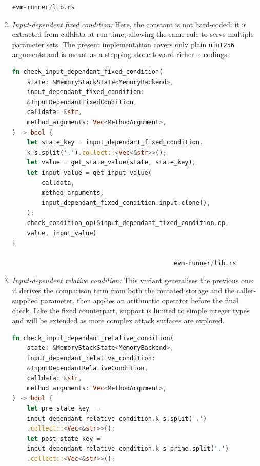 \begin{enumerate}
\begin{lstlisting}[caption={[check\_relative\_condition]},label={lst:relative},language=Rust]
                                            evm-runner/lib.rs
\end{lstlisting}

\item \textit{Input-dependent fixed condition:}  
      Here, the constant is not hard-coded: it is extracted from
      calldata at run-time, allowing the same rule to serve multiple parameter
      sets.  The present implementation covers only plain \texttt{uint256}
      arguments and is meant as a stepping-stone toward richer encodings.
\begin{lstlisting}[caption={[check\_input\_dependant\_fixed\_condition]},
                   label={lst:idfixed},language=Rust]
fn check_input_dependant_fixed_condition(
    state: &MemoryStackState<MemoryBackend>,
    input_dependant_fixed_condition: 
    &InputDependantFixedCondition,
    calldata: &str,
    method_arguments: Vec<MethodArgument>,
) -> bool {
    let state_key = input_dependant_fixed_condition.
    k_s.split('.').collect::<Vec<&str>>();
    let value = get_state_value(state, state_key);
    let input_value = get_input_value(
        calldata,
        method_arguments,
        input_dependant_fixed_condition.input.clone(),
    );
    check_condition_op(&input_dependant_fixed_condition.op, 
    value, input_value)
}

                                            evm-runner/lib.rs
\end{lstlisting}

\item \textit{Input-dependent relative condition:}  
      This variant generalises the previous one: it derives the comparison term from both the mutated storage and the caller-supplied parameter, then applies an arithmetic operator before the final check. Like the fixed counterpart, support is limited to simple integer types and will be extended as more complex attack surfaces are explored.
\begin{lstlisting}[caption={[check\_input\_dependant\_relative\_condition]},
                   label={lst:idrelative},language=Rust]
fn check_input_dependant_relative_condition(
    state: &MemoryStackState<MemoryBackend>,
    input_dependant_relative_condition: 
    &InputDependantRelativeCondition,
    calldata: &str,
    method_arguments: Vec<MethodArgument>,
) -> bool {
    let pre_state_key  = 
    input_dependant_relative_condition.k_s.split('.')
    .collect::<Vec<&str>>();
    let post_state_key = 
    input_dependant_relative_condition.k_s_prime.split('.')
    .collect::<Vec<&str>>();


\end{lstlisting}
\end{enumerate}
